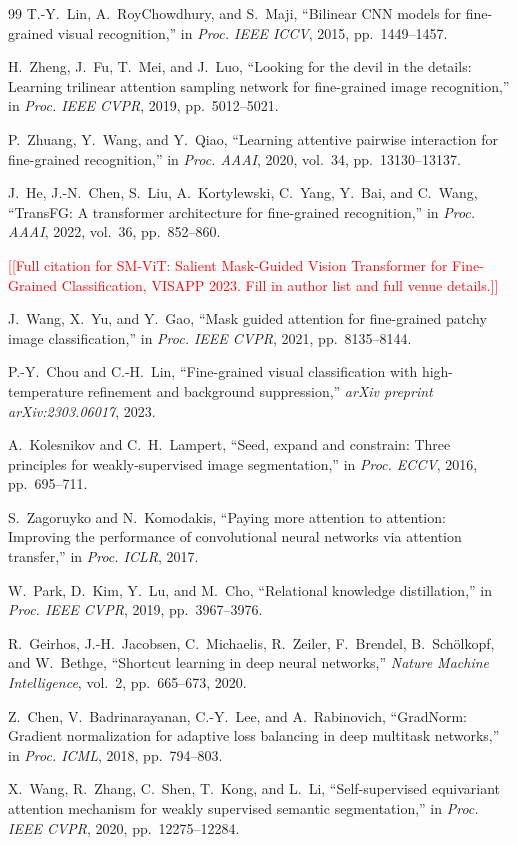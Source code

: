 \documentclass[journal]{IEEEtran}
\newcommand{\ph}[1]{\textcolor{red}{[#1]}}
\begin{document}
\begin{thebibliography}{99}
T.-Y.~Lin, A.~RoyChowdhury, and S.~Maji,
``Bilinear CNN models for fine-grained visual recognition,''
in \emph{Proc. IEEE ICCV}, 2015, pp.~1449--1457.

H.~Zheng, J.~Fu, T.~Mei, and J.~Luo,
``Looking for the devil in the details: Learning trilinear attention
sampling network for fine-grained image recognition,''
in \emph{Proc. IEEE CVPR}, 2019, pp.~5012--5021.

P.~Zhuang, Y.~Wang, and Y.~Qiao,
``Learning attentive pairwise interaction for fine-grained
recognition,''
in \emph{Proc. AAAI}, 2020, vol.~34, pp.~13130--13137.

J.~He, J.-N.~Chen, S.~Liu, A.~Kortylewski, C.~Yang,
Y.~Bai, and C.~Wang,
``TransFG: A transformer architecture for fine-grained recognition,''
in \emph{Proc. AAAI}, 2022, vol.~36, pp.~852--860.

\ph{[Full citation for SM-ViT: Salient Mask-Guided Vision
Transformer for Fine-Grained Classification, VISAPP 2023.
Fill in author list and full venue details.]}

J.~Wang, X.~Yu, and Y.~Gao,
``Mask guided attention for fine-grained patchy image
classification,''
in \emph{Proc. IEEE CVPR}, 2021, pp.~8135--8144.

P.-Y.~Chou and C.-H.~Lin,
``Fine-grained visual classification with high-temperature
refinement and background suppression,''
\emph{arXiv preprint arXiv:2303.06017}, 2023.

A.~Kolesnikov and C.~H.~Lampert,
``Seed, expand and constrain: Three principles for weakly-supervised
image segmentation,''
in \emph{Proc. ECCV}, 2016, pp.~695--711.

S.~Zagoruyko and N.~Komodakis,
``Paying more attention to attention: Improving the performance of
convolutional neural networks via attention transfer,''
in \emph{Proc. ICLR}, 2017.

W.~Park, D.~Kim, Y.~Lu, and M.~Cho,
``Relational knowledge distillation,''
in \emph{Proc. IEEE CVPR}, 2019, pp.~3967--3976.

R.~Geirhos, J.-H.~Jacobsen, C.~Michaelis, R.~Zeiler,
F.~Brendel, B.~Sch\"{o}lkopf, and W.~Bethge,
``Shortcut learning in deep neural networks,''
\emph{Nature Machine Intelligence}, vol.~2, pp.~665--673, 2020.

Z.~Chen, V.~Badrinarayanan, C.-Y.~Lee, and A.~Rabinovich,
``GradNorm: Gradient normalization for adaptive loss balancing in deep
multitask networks,''
in \emph{Proc. ICML}, 2018, pp.~794--803.

X.~Wang, R.~Zhang, C.~Shen, T.~Kong, and L.~Li,
``Self-supervised equivariant attention mechanism for weakly
supervised semantic segmentation,''
in \emph{Proc. IEEE CVPR}, 2020, pp.~12275--12284.

\end{thebibliography}
\end{document}
